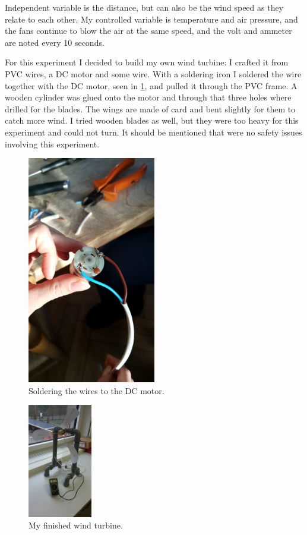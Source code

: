\documentclass[12pt]{article}
\begin{document}
Independent variable is the distance, but can also be the wind speed as they relate to each other.
My controlled variable is temperature and air pressure, and the fans continue to blow the air at the same speed, and the volt and ammeter are noted every 10 seconds.

For this experiment I decided to build my own wind turbine: I crafted it from PVC wires, a DC motor and some wire.
With a soldering iron I soldered the wire together with the DC motor, seen in \ref{figure:soldering}, and pulled it through the PVC frame.
A wooden cylinder was glued onto the motor and through that three holes where drilled for the blades.
The wings are made of card and bent slightly for them to catch more wind.
I tried wooden blades as well, but they were too heavy for this experiment and could not turn.
It should be mentioned that were no safety issues involving this experiment.

\begin{figure}[h]
  \centering
  \includegraphics[width=0.5\textwidth]{img/solder.jpg}
  \caption{Soldering the wires to the DC motor.}
  \label{figure:soldering}
\end{figure}
\begin{figure}[h]
  \centering
  \includegraphics[width=0.25\textwidth]{img/turbine.jpg}
  \caption{My finished wind turbine.}
  \label{figure:MyWindTurbine}
\end{figure}
\end{document}
